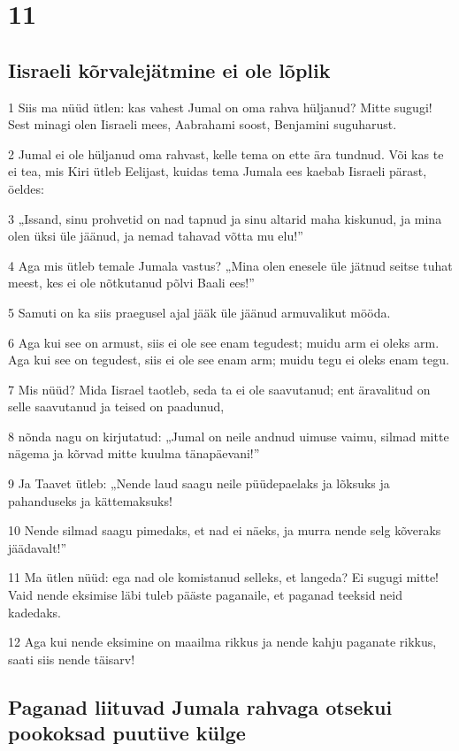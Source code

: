 \chapter{11}

\section*{Iisraeli kõrvalejätmine ei ole lõplik}

\par 1 Siis ma nüüd ütlen: kas vahest Jumal on oma rahva hüljanud? Mitte sugugi! Sest minagi olen Iisraeli mees, Aabrahami soost, Benjamini suguharust.
\par 2 Jumal ei ole hüljanud oma rahvast, kelle tema on ette ära tundnud. Või kas te ei tea, mis Kiri ütleb Eelijast, kuidas tema Jumala ees kaebab Iisraeli pärast, öeldes:
\par 3 „Issand, sinu prohvetid on nad tapnud ja sinu altarid maha kiskunud, ja mina olen üksi üle jäänud, ja nemad tahavad võtta mu elu!”
\par 4 Aga mis ütleb temale Jumala vastus? „Mina olen enesele üle jätnud seitse tuhat meest, kes ei ole nõtkutanud põlvi Baali ees!”
\par 5 Samuti on ka siis praegusel ajal jääk üle jäänud armuvalikut mööda.
\par 6 Aga kui see on armust, siis ei ole see enam tegudest; muidu arm ei oleks arm. Aga kui see on tegudest, siis ei ole see enam arm; muidu tegu ei oleks enam tegu.
\par 7 Mis nüüd? Mida Iisrael taotleb, seda ta ei ole saavutanud; ent äravalitud on selle saavutanud ja teised on paadunud,
\par 8 nõnda nagu on kirjutatud: „Jumal on neile andnud uimuse vaimu, silmad mitte nägema ja kõrvad mitte kuulma tänapäevani!”
\par 9 Ja Taavet ütleb: „Nende laud saagu neile püüdepaelaks ja lõksuks ja pahanduseks ja kättemaksuks!
\par 10 Nende silmad saagu pimedaks, et nad ei näeks, ja murra nende selg kõveraks jäädavalt!”
\par 11 Ma ütlen nüüd: ega nad ole komistanud selleks, et langeda? Ei sugugi mitte! Vaid nende eksimise läbi tuleb pääste paganaile, et paganad teeksid neid kadedaks.
\par 12 Aga kui nende eksimine on maailma rikkus ja nende kahju paganate rikkus, saati siis nende täisarv!

\section*{Paganad liituvad Jumala rahvaga otsekui pookoksad puutüve külge}

